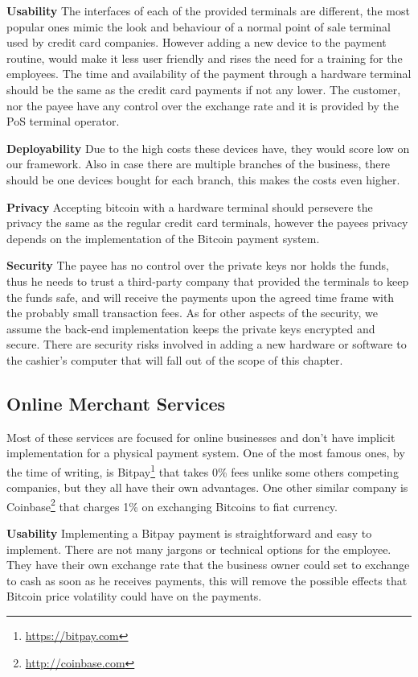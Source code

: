\textbf{Usability}
The interfaces of each of the provided terminals are different, the most popular ones mimic the look and behaviour of a normal point of sale terminal used by credit card companies. However adding a new device to the payment routine, would make it less user friendly and rises the need for a training for the employees. The time and availability of the payment through a hardware terminal should be the same as the credit card payments if not any lower. The customer, nor the payee have any control over the exchange rate and it is provided by the PoS terminal operator.

\textbf{Deployability}
Due to the high costs these devices have, they would score low on our framework. Also in case there are multiple branches of the business, there should be one devices bought for each branch, this makes the costs even higher.

\textbf{Privacy}
Accepting bitcoin with a hardware terminal should persevere the privacy the same as the regular credit card terminals, however the payees privacy depends on the implementation of the Bitcoin payment system. 

\textbf{Security}
The payee has no control over the private keys nor holds the funds, thus he needs to trust a third-party company that provided the terminals to keep the funds safe, and will receive the payments upon the agreed time frame with the probably small transaction fees. As for other aspects of the security, we assume the back-end implementation keeps the private keys encrypted and secure. There are security risks involved in adding a new hardware or software to the cashier's computer that will fall out of the scope of this chapter.

\subsection{Online Merchant Services}
Most of these services are focused for online businesses and don't have implicit implementation for a physical payment system. 
One of the most famous ones, by the time of writing, is Bitpay\footnote{\url{https://bitpay.com}} that takes 0\% fees unlike some others competing companies, but they all have their own advantages. One other similar company is Coinbase\footnote{\url{http://coinbase.com}} that charges 1\% on exchanging Bitcoins to fiat currency.

 \textbf{Usability}
Implementing a Bitpay payment is straightforward and easy to implement. There are not many jargons or technical options for the employee. They have their own exchange rate that the business owner could set to exchange to cash as soon as he receives payments, this will remove the possible effects that Bitcoin price volatility could have on the payments.


